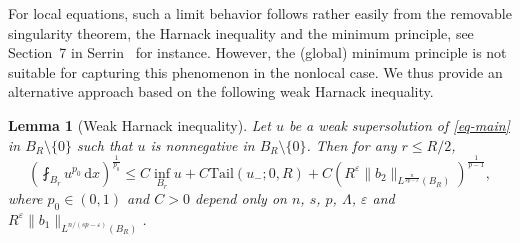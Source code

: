 \documentclass[11pt]{amsart}
\theoremstyle{plain}
\newtheorem{lemma}[theorem]{Lemma}
\theoremstyle{definition}
\numberwithin{equation}{section}
\begin{document}
For local equations, such a limit behavior follows rather easily from the removable singularity theorem, the Harnack inequality and the minimum principle, see Section~7 in Serrin~\cite{Ser64} for instance. However, the (global) minimum principle is not suitable for capturing this phenomenon in the nonlocal case. We thus provide an alternative approach based on the following weak Harnack inequality.

\begin{lemma}[Weak Harnack inequality]\label{lem-WHI}
Let $u$ be a weak supersolution of \eqref{eq-main} in $B_R \setminus \{0\}$ such that $u$ is nonnegative in $B_R \setminus \{0\}$. Then for any $r \leq R/2$,
\begin{equation*}
	\left(\fint_{B_r} u^{p_0}\,\mathrm{d}x\right)^{\frac{1}{p_0}} \leq C \inf_{B_{r}} u+C \mathrm{Tail}(u_-; 0, R) + C\left( R^\varepsilon \|b_2\|_{L^{\frac{n}{sp-\varepsilon}}(B_R)} \right)^{\frac{1}{p-1}},
\end{equation*}
where $p_0 \in (0,1)$ and $C>0$ depend only on $n$, $s$, $p$, $\Lambda$, $\varepsilon$ and $R^\varepsilon \|b_1\|_{L^{n/(sp-\varepsilon)}(B_R)}$.
\end{lemma}
\end{document}
